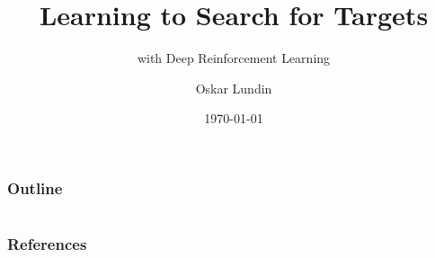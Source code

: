 \documentclass[]{beamer} %
\title{Learning to Search for Targets}
\subtitle{with Deep Reinforcement Learning}
\author{Oskar Lundin}
\institute{Linköping University}
\date{\today}
\begin{document}
\begin{frame}
    \titlepage
\end{frame}

\begin{frame}
    \frametitle{Outline}
    \tableofcontents
\end{frame}







\section{}
\subsection{}
\begin{frame}[t,allowframebreaks]
    \frametitle{References}
    
    
\end{frame}
\end{document}
